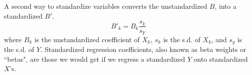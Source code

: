 \documentclass[11pt,openany]{book}\usepackage[]{graphicx}\usepackage[]{color}
\begin{document}
A second way to standardize variables converts the unstandardized $B$, into a standardized $B'$. 
\begin{equation}
  B'_k = B_k\frac{s_k}{s_Y}  
\end{equation}
where $B_k$ is the unstandardized coefficient of $X_k$, $s_k$ is the s.d. of $X_k$, and $s_y$ is the s.d. of $Y$. Standardized regression coefficients, also known as beta weights or ``betas", are those we would get if we regress a standardized $Y$ onto standardized $X$’s. 
 
\begin{grbox}
\end{grbox}
\end{document}

